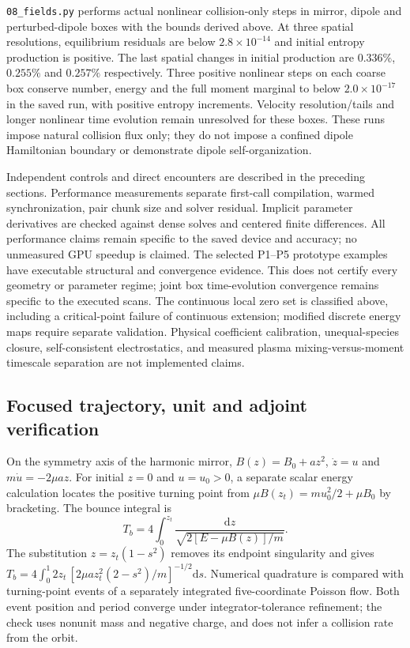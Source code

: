 \documentclass[11pt,letterpaper]{article}
\newcommand{\dd}{\mathrm d}
\begin{document}
\texttt{08\_fields.py} performs actual nonlinear collision-only steps in mirror,
dipole and perturbed-dipole boxes with the bounds derived above. At three
spatial resolutions, equilibrium residuals are below $2.8\times10^{-14}$ and
initial entropy production is positive. The last spatial changes in initial
production are $0.336\%$, $0.255\%$ and $0.257\%$ respectively. Three positive
nonlinear steps on each coarse box conserve number, energy and the full moment
marginal to below $2.0\times10^{-17}$ in the saved run, with positive entropy
increments. Velocity resolution/tails and longer nonlinear time evolution
remain unresolved for these boxes. These runs impose natural collision flux
only; they do not impose a confined dipole Hamiltonian boundary or demonstrate
dipole self-organization.

Independent controls and direct encounters are described in the preceding sections. Performance
measurements separate first-call compilation, warmed synchronization, pair chunk
size and solver residual. Implicit parameter derivatives are checked against
dense solves and centered finite differences. All performance claims remain
specific to the saved device and accuracy; no unmeasured GPU speedup is claimed.
The selected P1--P5 prototype examples have executable structural and
convergence evidence. This does not certify every geometry or parameter regime;
joint box time-evolution convergence remains specific to the executed scans.
The continuous local zero set is classified above, including a critical-point
failure of continuous extension; modified discrete energy maps require separate
validation. Physical
coefficient calibration, unequal-species closure, self-consistent electrostatics,
and measured plasma mixing-versus-moment timescale separation are not implemented
claims.


\subsection*{Focused trajectory, unit and adjoint verification}
On the symmetry axis of the harmonic mirror, $B(z)=B_0+a z^2$,
$\dot z=u$ and $m\dot u=-2\mu a z$. For initial $z=0$ and
$u=u_0>0$, a separate scalar energy calculation locates the positive
turning point from $\mu B(z_t)=m u_0^2/2+\mu B_0$ by bracketing.
The bounce integral is
\[
 T_b=4\int_0^{z_t}\frac{\dd z}
 {\sqrt{2[E-\mu B(z)]/m}}.
\]
The substitution $z=z_t(1-s^2)$ removes its endpoint singularity and gives
$T_b=4\int_0^1 2z_t\,[2\mu a z_t^2(2-s^2)/m]^{-1/2}\dd s$.
Numerical quadrature is compared with turning-point events of a separately
integrated five-coordinate Poisson flow. Both event position and period
converge under integrator-tolerance refinement; the check uses nonunit mass
and negative charge, and does not infer a collision rate from the orbit.
\end{document}
